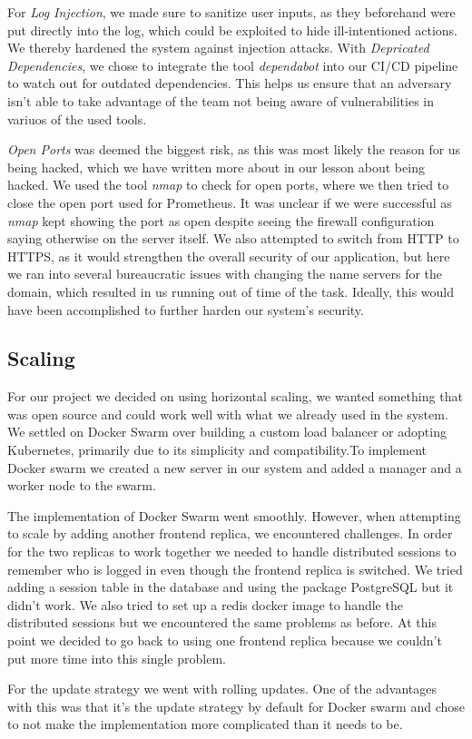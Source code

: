 For \textit{Log Injection}, we made sure to sanitize user inputs, as they beforehand were put directly into the log, which could be exploited to hide ill-intentioned actions. We thereby hardened the system against injection attacks.
With \textit{Depricated Dependencies}, we chose to integrate the tool \textit{dependabot} into our CI/CD pipeline to watch out for outdated dependencies. This helps us ensure that an adversary isn't able to take advantage of the team not being aware of vulnerabilities in variuos of the used tools.

\textit{Open Ports} was deemed the biggest risk, as this was most likely the reason for us being hacked, which we have written more about in our lesson about being hacked. We used the tool \textit{nmap} to check for open ports, where we then tried to close the open port used for Prometheus. It was unclear if we were successful as \textit{nmap} kept showing the port as open despite seeing the firewall configuration saying otherwise on the server itself.
We also attempted to switch from HTTP to HTTPS, as it would strengthen the overall security of our application, but here we ran into several bureaucratic issues with changing the name servers for the domain, which resulted in us running out of time of the task. Ideally, this would have been accomplished to further harden our system's security.

\subsection{Scaling}
For our project we decided on using horizontal scaling, we wanted something that was open source and could work well with what we already used in the system. We settled on Docker Swarm over building a custom load balancer or adopting Kubernetes, primarily due to its simplicity and compatibility.To implement Docker swarm we created a new server in our system and added a manager and a worker node to the swarm. 

The implementation of Docker Swarm went smoothly. However, when attempting to scale by adding another frontend replica, we encountered challenges. In order for the two replicas to work together we needed to handle distributed sessions to remember who is logged in even though the frontend replica is switched. We tried adding a session table in the database and using the package PostgreSQL but it didn’t work. We also tried to set up a redis docker image to handle the distributed sessions but we encountered the same problems as before. At this point we decided to go back to using one frontend replica because we couldn’t put more time into this single problem. 

For the update strategy we went with rolling updates. One of the advantages with this was that it’s the update strategy by default for Docker swarm and chose to not make the implementation more complicated than it needs to be. 

